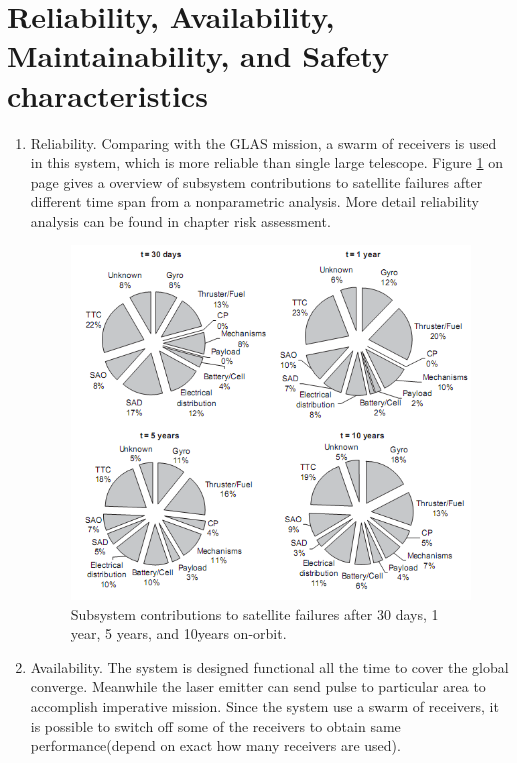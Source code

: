 \section{Reliability, Availability, Maintainability, and Safety characteristics}
\label{blRAMS}

\begin{enumerate}
	\item Reliability. Comparing with the GLAS mission, a swarm of receivers is used in this system, which is more reliable than single large telescope. Figure \ref{R} on page \pageref{R} gives a overview of subsystem contributions to satellite failures after different time span from a nonparametric analysis. More detail reliability analysis can be found in chapter risk assessment.
	\begin{figure} [H]
	\begin{center}
         \includegraphics[width=1.0\textwidth,angle=0]{img/subsystem_reliability_analysis.png}
	\end{center}
	\caption{Subsystem contributions to satellite failures after 30 days, 1 year, 5 years, and 10years on-orbit.}
	\label{R}
	\end{figure}

	\item Availability. The system is designed functional all the time to cover the global converge. Meanwhile the laser emitter can send pulse to particular area to accomplish imperative mission. Since the system use a swarm of receivers, it is possible to switch off some of the receivers to obtain same performance(depend on exact how many receivers are used).


\end{enumerate}
